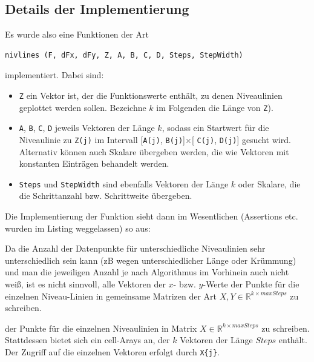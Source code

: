 \documentclass[a4paper,11pt,bibliography=totoc,listof=totoc,headinclude=true,cleardoublepage=empty,oneside]{scrartcl}
\newcommand{\R}{\mathbb{R}}
\begin{document}
\subsection{Details der Implementierung}

Es wurde also eine Funktionen der Art
\begin{verbatim}
nivlines (F, dFx, dFy, Z, A, B, C, D, Steps, StepWidth)
\end{verbatim}
implementiert. Dabei sind:
\begin{itemize}
	\item \verb|Z| ein Vektor ist, der die Funktionswerte enthält, zu denen Niveaulinien geplottet werden sollen. Bezeichne $k$ im Folgenden die Länge von \verb|Z|).
	\item \verb|A|, \verb|B|, \verb|C|, \verb|D| jeweils Vektoren der Länge $k$, sodass ein Startwert für die Niveaulinie zu \verb|Z(j)| im Intervall [\verb|A(j)|, \verb|B(j)|]$\times$[ \verb|C(j)|, \verb|D(j)|] gesucht wird. Alternativ können auch Skalare übergeben werden, die wie Vektoren mit konstanten Einträgen behandelt werden.
	\item  \verb|Steps| und \verb|StepWidth| sind ebenfalls Vektoren der Länge $k$ oder Skalare, die die Schrittanzahl bzw. Schrittweite übergeben.
\end{itemize}

Die Implementierung der Funktion sieht dann im Wesentlichen (Assertions etc. wurden im Listing weggelassen) so aus:




Da die Anzahl der Datenpunkte für unterschiedliche Niveaulinien sehr unterschiedlich sein kann (zB wegen unterschiedlicher Länge oder Krümmung) und man die jeweiligen Anzahl je nach Algorithmus im Vorhinein auch nicht weiß, ist es nicht sinnvoll, alle Vektoren der $x$- bzw. $y$-Werte der Punkte für die einzelnen Niveau-Linien in gemeinsame Matrizen der Art $X, Y \in \R^{k \times maxSteps}$ zu schreiben.


der Punkte für die einzelnen Niveaulinien in Matrix $X \in \R^{k \times maxSteps}$ zu schreiben. Stattdessen bietet sich ein cell-Arays an, der $k$ Vektoren der Länge $Steps$ enthält. Der Zugriff auf die einzelnen Vektoren erfolgt durch \verb|X{j}|.
\end{document}
